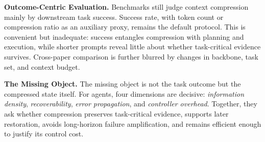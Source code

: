

\noindent\textbf{Outcome-Centric Evaluation.}
Benchmarks still judge context compression mainly by downstream task success. Success rate, with token count or compression ratio as an auxiliary proxy, remains the default protocol. This is convenient but inadequate: success entangles compression with planning and execution, while shorter prompts reveal little about whether task-critical evidence survives. Cross-paper comparison is further blurred by changes in backbone, task set, and context budget.


\noindent\textbf{The Missing Object.} The missing object is not the task outcome but the compressed state itself. For agents, four dimensions are decisive: \textit{information density}, \textit{recoverability}, \textit{error propagation}, and \textit{controller overhead}. Together, they ask whether compression preserves task-critical evidence, supports later restoration, avoids long-horizon failure amplification, and remains efficient enough to justify its control cost.

